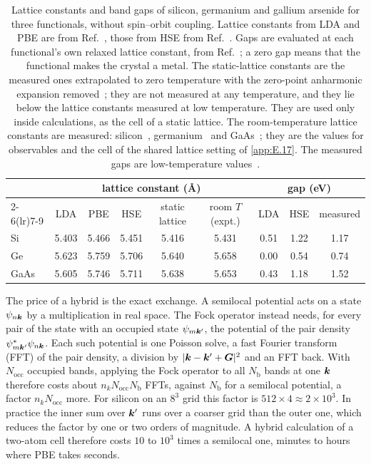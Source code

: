 \begin{table}[t]
  \centering
  \caption{Lattice constants and band gaps of silicon, germanium and gallium arsenide for three functionals, without spin--orbit coupling. Lattice constants from LDA and PBE are from Ref.~\cite[Table~II]{csonka2009assessing}, those from HSE from Ref.~\cite[Table~I]{lucero2012improved}. Gaps are evaluated at each functional's own relaxed lattice constant, from Ref.~\cite[Table~I]{lucero2012improved}; a zero gap means that the functional makes the crystal a metal. The static-lattice constants are the measured ones extrapolated to zero temperature with the zero-point anharmonic expansion removed~\cite[Table~II]{csonka2009assessing}; they are not measured at any temperature, and they lie below the lattice constants measured at low temperature. They are used only inside calculations, as the cell of a static lattice. The room-temperature lattice constants are measured: silicon~\cite[lattice parameter of silicon]{mohr2025codata}, germanium~\cite[Sect.~II\,A]{rideau2006strained} and GaAs~\cite{vurgaftman2001band}; they are the values for observables and the cell of the shared lattice setting of \cref{app:E.17}. The measured gaps are low-temperature values~\cite[Table~I]{lucero2012improved}.}
  \label{tab:E-functionals}
  \begin{tabular}{l ccccc ccc}
    \toprule
    & \multicolumn{5}{c}{lattice constant (\AA)} & \multicolumn{3}{c}{gap (eV)} \\
    \cmidrule(lr){2-6}\cmidrule(lr){7-9}
    & LDA & PBE & HSE & static lattice & room $T$ (expt.) & LDA & HSE & measured \\
    \midrule
    Si   & 5.403 & 5.466 & 5.451 & 5.416 & 5.431 & 0.51 & 1.22 & 1.17 \\
    Ge   & 5.623 & 5.759 & 5.706 & 5.640 & 5.658 & 0.00 & 0.54 & 0.74 \\
    GaAs & 5.605 & 5.746 & 5.711 & 5.638 & 5.653 & 0.43 & 1.18 & 1.52 \\
    \bottomrule
  \end{tabular}
\end{table}

The price of a hybrid is the exact exchange. A semilocal potential acts on a state $\psi_{n\bm{k}}$ by a multiplication in real space. The Fock operator instead needs, for every pair of the state with an occupied state $\psi_{m\bm{k}'}$, the potential of the pair density $\psi^*_{m\bm{k}'}\psi_{n\bm{k}}$. Each such potential is one Poisson solve, a fast Fourier transform (FFT) of the pair density, a division by $|\bm{k} - \bm{k}' + \bm{G}|^2$ and an FFT back. With $N_{\mathrm{occ}}$ occupied bands, applying the Fock operator to all $N_{\mathrm{b}}$ bands at one $\bm{k}$ therefore costs about $n_kN_{\mathrm{occ}}N_{\mathrm{b}}$ FFTs, against $N_{\mathrm{b}}$ for a semilocal potential, a factor $n_kN_{\mathrm{occ}}$ more. For silicon on an $8^3$ grid this factor is $512\times4 \approx 2\times10^3$. In practice the inner sum over $\bm{k}'$ runs over a coarser grid than the outer one, which reduces the factor by one or two orders of magnitude. A hybrid calculation of a two-atom cell therefore costs $10$ to $10^3$ times a semilocal one, minutes to hours where PBE takes seconds.

